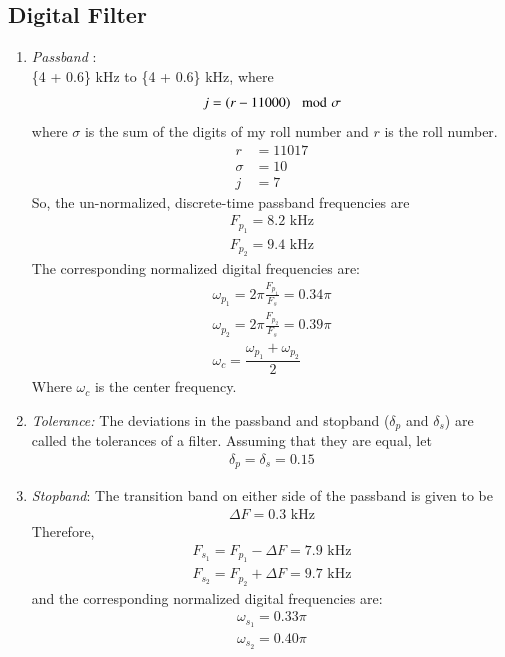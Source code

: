 \documentclass[journal,12pt,twocolumn]{IEEEtran}
\theoremstyle{remark}
\begin{document}
    \subsection{Digital Filter}
    \begin{enumerate}
        \item \textit {Passband }: \\\{4 + 0.6\} kHz to \{4 + 0.6\} kHz, where 
        \begin{align}
            j = \left(r - 11000\right) \mod \sigma
        \end{align}
        where $\sigma$ is the sum of the digits of my roll number and $r$ is the roll number.
        \begin{align}
            r &= 11017 \\
            \sigma &= 10 \\
            j &= 7
        \end{align}
        So, the un-normalized, discrete-time passband frequencies are 
        \begin{align}
            F_{p_1} = 8.2\text{ kHz}\\
            F_{p_2} = 9.4\text{ kHz}
        \end{align}
        The corresponding normalized digital frequencies are: 
        \begin{align}
            \omega_{p_1} = 2\pi \frac{F_{p_1}}{F_s} = 0.34 \pi\\
            \omega_{p_2} = 2\pi \frac{F_{p_2}}{F_s} = 0.39 \pi \\
            \omega_{c} = \dfrac{\omega_{p_1}+\omega_{p_2}}{2}
            \end{align}
            Where $\omega_c$ is the center frequency.

        \item \textit {Tolerance: }The deviations in the passband and stopband ($\delta_p$ and $\delta_s$) are called the tolerances of a filter. Assuming that they are equal, let 
        \begin{align}
            \delta_p = \delta_s = 0.15
        \end{align}
        \item \textit {Stopband}: The transition band on either side of the passband is given to be \begin{align}
            \Delta F = 0.3 \text{ kHz}
        \end{align}
        Therefore, 
        \begin{align}
            F_{s_1} = F_{p_1} - \Delta F = 7.9 \text{ kHz}\\
            F_{s_2} = F_{p_2} + \Delta F = 9.7 \text{ kHz}
        \end{align}
        and the corresponding normalized digital frequencies are: 
        \begin{align}
            \omega_{s_1} = 0.33 \pi\\
            \omega_{s_2} = 0.40 \pi 
            \end{align}
        \end{enumerate}
\end{document}
